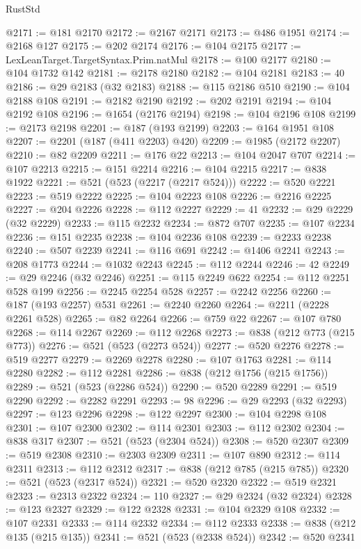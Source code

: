 \begin{lexlean}{RustStd}
\begin{coremodule}
{\begin{coremodule}
{{{{{{{{{{{{{{{{{{{{{{{{{{{{{{{{{{{{{{{{{{{{{{{{{{{{{{{@2171 := @181 @2170
@2172 := @2167 @2171
@2173 := @486 @1951
@2174 := @2168 @127
@2175 := @202 @2174
@2176 := @104 @2175
@2177 := LexLeanTarget.TargetSyntax.Prim.natMul
@2178 := @100 @2177
@2180 := @104 @1732 @142
@2181 := @2178 @2180
@2182 := @104 @2181
@2183 := 40
@2186 := @29 @2183 (@32 @2183)
@2188 := @115 @2186 @510
@2190 := @104 @2188 @108
@2191 := @2182 @2190
@2192 := @202 @2191
@2194 := @104 @2192 @108
@2196 := @1654 (@2176 @2194)
@2198 := @104 @2196 @108
@2199 := @2173 @2198
@2201 := @187 (@193 @2199)
@2203 := @164 @1951 @108
@2207 := @2201 (@187 (@411 @2203) @420)
@2209 := @1985 (@2172 @2207)
@2210 := @82 @2209
@2211 := @176 @22
@2213 := @104 @2047 @707
@2214 := @107 @2213
@2215 := @151 @2214
@2216 := @104 @2215
@2217 := @838 @1922
@2221 := @521 (@523 (@2217 (@2217 @524)))
@2222 := @520 @2221
@2223 := @519 @2222
@2225 := @104 @2223 @108
@2226 := @2216 @2225
@2227 := @204 @2226
@2228 := @112 @2227
@2229 := 41
@2232 := @29 @2229 (@32 @2229)
@2233 := @115 @2232
@2234 := @872 @707
@2235 := @107 @2234
@2236 := @151 @2235
@2238 := @104 @2236 @108
@2239 := @2233 @2238
@2240 := @507 @2239
@2241 := @116 @691
@2242 := @1406 @2241
@2243 := @208 @1773
@2244 := @1032 @2243
@2245 := @112 @2244
@2246 := 42
@2249 := @29 @2246 (@32 @2246)
@2251 := @115 @2249 @622
@2254 := @112 @2251 @528 @199
@2256 := @2245 @2254 @528
@2257 := @2242 @2256
@2260 := @187 (@193 @2257) @531
@2261 := @2240 @2260
@2264 := @2211 (@2228 @2261 @528)
@2265 := @82 @2264
@2266 := @759 @22
@2267 := @107 @780
@2268 := @114 @2267
@2269 := @112 @2268
@2273 := @838 (@212 @773 (@215 @773))
@2276 := @521 (@523 (@2273 @524))
@2277 := @520 @2276
@2278 := @519 @2277
@2279 := @2269 @2278
@2280 := @107 @1763
@2281 := @114 @2280
@2282 := @112 @2281
@2286 := @838 (@212 @1756 (@215 @1756))
@2289 := @521 (@523 (@2286 @524))
@2290 := @520 @2289
@2291 := @519 @2290
@2292 := @2282 @2291
@2293 := 98
@2296 := @29 @2293 (@32 @2293)
@2297 := @123 @2296
@2298 := @122 @2297
@2300 := @104 @2298 @108
@2301 := @107 @2300
@2302 := @114 @2301
@2303 := @112 @2302
@2304 := @838 @317
@2307 := @521 (@523 (@2304 @524))
@2308 := @520 @2307
@2309 := @519 @2308
@2310 := @2303 @2309
@2311 := @107 @890
@2312 := @114 @2311
@2313 := @112 @2312
@2317 := @838 (@212 @785 (@215 @785))
@2320 := @521 (@523 (@2317 @524))
@2321 := @520 @2320
@2322 := @519 @2321
@2323 := @2313 @2322
@2324 := 110
@2327 := @29 @2324 (@32 @2324)
@2328 := @123 @2327
@2329 := @122 @2328
@2331 := @104 @2329 @108
@2332 := @107 @2331
@2333 := @114 @2332
@2334 := @112 @2333
@2338 := @838 (@212 @135 (@215 @135))
@2341 := @521 (@523 (@2338 @524))
@2342 := @520 @2341
}}}}}}}}}}}}}}}}}}}}}}}}}}}}}}}}}}}}}}}}}}}}}}}}}}}}}}}
\end{coremodule}}
\end{coremodule}
\end{lexlean}

